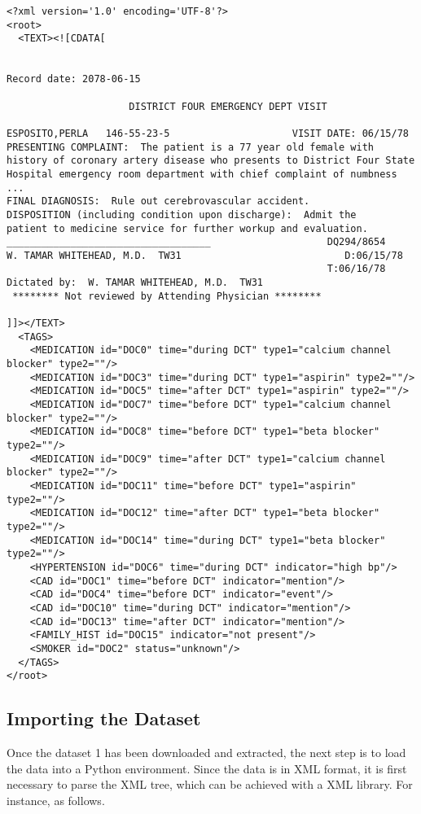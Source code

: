 \documentclass[a4paper,12pt]{article}
\begin{document}
\begin{verbatim}
<?xml version='1.0' encoding='UTF-8'?>
<root>
  <TEXT><![CDATA[


Record date: 2078-06-15

                     DISTRICT FOUR EMERGENCY DEPT VISIT
 
ESPOSITO,PERLA   146-55-23-5                     VISIT DATE: 06/15/78
PRESENTING COMPLAINT:  The patient is a 77 year old female with 
history of coronary artery disease who presents to District Four State
Hospital emergency room department with chief complaint of numbness 
...
FINAL DIAGNOSIS:  Rule out cerebrovascular accident. 
DISPOSITION (including condition upon discharge):  Admit the 
patient to medicine service for further workup and evaluation. 
___________________________________                    DQ294/8654 
W. TAMAR WHITEHEAD, M.D.  TW31                            D:06/15/78 
                                                       T:06/16/78 
Dictated by:  W. TAMAR WHITEHEAD, M.D.  TW31 
 ******** Not reviewed by Attending Physician ********

]]></TEXT>
  <TAGS>
    <MEDICATION id="DOC0" time="during DCT" type1="calcium channel blocker" type2=""/>
    <MEDICATION id="DOC3" time="during DCT" type1="aspirin" type2=""/>
    <MEDICATION id="DOC5" time="after DCT" type1="aspirin" type2=""/>
    <MEDICATION id="DOC7" time="before DCT" type1="calcium channel blocker" type2=""/>
    <MEDICATION id="DOC8" time="before DCT" type1="beta blocker" type2=""/>
    <MEDICATION id="DOC9" time="after DCT" type1="calcium channel blocker" type2=""/>
    <MEDICATION id="DOC11" time="before DCT" type1="aspirin" type2=""/>
    <MEDICATION id="DOC12" time="after DCT" type1="beta blocker" type2=""/>
    <MEDICATION id="DOC14" time="during DCT" type1="beta blocker" type2=""/>
    <HYPERTENSION id="DOC6" time="during DCT" indicator="high bp"/>
    <CAD id="DOC1" time="before DCT" indicator="mention"/>
    <CAD id="DOC4" time="before DCT" indicator="event"/>
    <CAD id="DOC10" time="during DCT" indicator="mention"/>
    <CAD id="DOC13" time="after DCT" indicator="mention"/>
    <FAMILY_HIST id="DOC15" indicator="not present"/>
    <SMOKER id="DOC2" status="unknown"/>
  </TAGS>
</root>
\end{verbatim}

\subsection{Importing the Dataset}
Once the dataset 1 has been downloaded and extracted, the next step is to load
the data into a Python environment.
Since the data is in XML format, it is first necessary to parse the XML tree,
which can be achieved with a XML library.
For instance, as follows.
\end{document}
